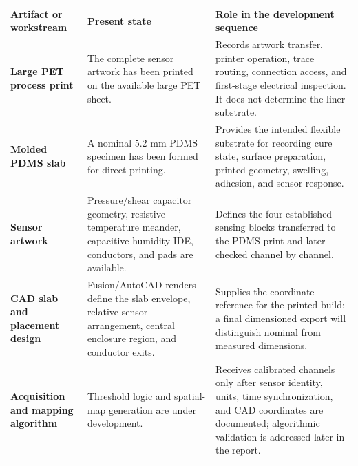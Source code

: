 \begingroup
\fontsize{8.85}{10.35}\selectfont
\renewcommand{\arraystretch}{1.14}
\begin{tabularx}{\linewidth}{>{\raggedright\arraybackslash\bfseries\color{AUBRed}}p{3.0cm}Y Y}
\color{white}\textbf{Artifact or workstream} &
\color{white}\textbf{Present state} &
\color{white}\textbf{Role in the development sequence} \\
Large PET process print & The complete sensor artwork has been printed on the
available large PET sheet. & Records artwork transfer, printer operation,
trace routing, connection access, and first-stage electrical inspection. It
does not determine the liner substrate. \\
Molded PDMS slab & A nominal 5.2 mm PDMS specimen has been formed for direct
printing. & Provides the intended flexible substrate for recording cure state,
surface preparation, printed geometry, swelling, adhesion, and sensor response. \\
Sensor artwork & Pressure/shear capacitor geometry, resistive temperature
meander, capacitive humidity IDE, conductors, and pads are available. & Defines
the four established sensing blocks transferred to the PDMS print and later
checked channel by channel. \\
CAD slab and placement design & Fusion/AutoCAD renders define the slab envelope,
relative sensor arrangement, central enclosure region, and conductor exits. &
Supplies the coordinate reference for the printed build; a final dimensioned
export will distinguish nominal from measured dimensions. \\
Acquisition and mapping algorithm & Threshold logic and spatial-map generation
are under development. & Receives calibrated channels only after sensor identity,
units, time synchronization, and CAD coordinates are documented; algorithmic
validation is addressed later in the report. \\
\end{tabularx}
\endgroup
{}


